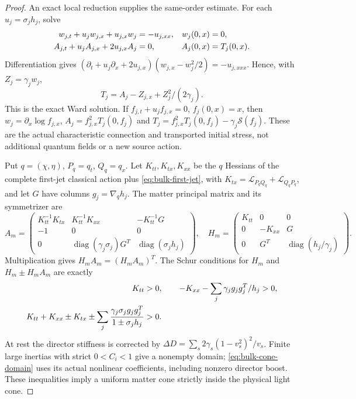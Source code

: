 \documentclass[12pt,a4paper]{article}
\begin{document}
\begin{proof}
An exact local reduction supplies the same-order estimate. For each
$u_j=\sigma_jh_j$, solve
\begin{align}
 w_{j,t}+u_jw_{j,x}+u_{j,x}w_j&=-u_{j,xx},
 &w_j(0,x)&=0,\notag\\
 A_{j,t}+u_jA_{j,x}+2u_{j,x}A_j&=0,
 &A_j(0,x)&=T_j(0,x).                                    \label{eq:bulk-local-transport}
\end{align}
Differentiation gives
$(\partial_t+u_j\partial_x+2u_{j,x})(w_{j,x}-w_j^2/2)
=-u_{j,xxx}$. Hence, with $Z_j=\gamma_jw_j$,
\begin{equation}
 T_j=A_j-Z_{j,x}+Z_j^2/(2\gamma_j).                       \label{eq:bulk-local-stress}
\end{equation}
This is the exact Ward solution. If
$f_{j,t}+u_jf_{j,x}=0$, $f_j(0,x)=x$, then
$w_j=\partial_x\log f_{j,x}$,
$A_j=f_{j,x}^2T_j(0,f_j)$ and
$T_j=f_{j,x}^2T_j(0,f_j)-\gamma_j\mathcal S(f_j)$.
These are the actual characteristic connection and transported initial
stress, not additional quantum fields or a new source action.

Put $q=(\chi,\eta)$, $P_q=q_t$, $Q_q=q_x$.
Let $K_{tt},K_{tx},K_{xx}$ be the $q$ Hessians of
the complete first-jet classical action plus \eqref{eq:bulk-first-jet},
with $K_{tx}=\mathcal L_{P_qQ_q}+\mathcal L_{Q_qP_q}$, and let
$G$ have columns $g_j=\nabla_qh_j$. The matter principal matrix and
its symmetrizer are
\begin{equation}
 A_m=\begin{pmatrix}
 K_{tt}^{-1}K_{tx}&K_{tt}^{-1}K_{xx}&-K_{tt}^{-1}G\\
 -1&0&0\\0&\operatorname{diag}(\gamma_j\sigma_j)G^T&
                 \operatorname{diag}(\sigma_jh_j)
 \end{pmatrix},\quad
 H_m=\begin{pmatrix}K_{tt}&0&0\\
 0&-K_{xx}&G\\0&G^T&\operatorname{diag}(h_j/\gamma_j)
 \end{pmatrix}.                                          \label{eq:bulk-symmetrizer}
\end{equation}
Multiplication gives $H_mA_m=(H_mA_m)^T$. The Schur conditions for
$H_m$ and $H_m\pm H_mA_m$ are exactly
\begin{align}
 K_{tt}&>0,\qquad
 -K_{xx}-\sum_j\gamma_jg_jg_j^T/h_j>0,\notag\\
 K_{tt}+K_{xx}\pm K_{tx}
       \pm\sum_j\frac{\gamma_j\sigma_jg_jg_j^T}
                              {1\pm\sigma_jh_j}&>0.       \label{eq:bulk-cone-domain}
\end{align}
At rest the director stiffness is corrected by
$\Delta D=\sum_s2\gamma_s(1-v_s^2)^2/v_s$.
Finite large inertias with strict $0<C_i<1$ give a nonempty domain;
\eqref{eq:bulk-cone-domain} uses its actual nonlinear coefficients,
including nonzero director boost. These inequalities imply a uniform
matter cone strictly inside the physical light cone.


\end{proof}
\end{document}
